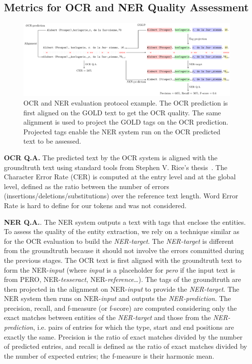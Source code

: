 \subsection{Metrics for OCR and NER Quality Assessment}

\begin{figure}[tb]
    \includegraphics[width=\linewidth]{figs/eval-ocr-ner.pdf}
    \caption{OCR and NER evaluation protocol example. The OCR prediction is first aligned on the GOLD text to get the
    OCR quality. The same alignment is used to project the GOLD tags on the OCR prediction. Projected tags enable
    the NER system run on the OCR predicted text to be assessed.}
    \label{fig.eval-ocr-ner}
\end{figure}

\textbf{OCR Q.A.}  The predicted text by the OCR system is aligned with the groundtruth text using standard tools from
Stephen V. Rice's thesis~\cite{santos.2019.wcmel,neudecker.2021.whdip}. The Character Error Rate (CER) is computed at
the entry level and at the global level, defined as the ratio between the number of errors
(insertions/deletions/substitutions) over the reference text length.
Word Error Rate is hard to define for our tokens and was not considered.



\textbf{NER Q.A.}. The NER system outputs a text with tags that enclose the entities. To assess the quality of the
entity extraction, we rely on a technique similar as for the OCR evaluation to build the \emph{NER-target}. The
\emph{NER-target} is different from the groundtruth because it should not involve the errors committed during the
previous stages. The OCR text is first aligned with the groundtruth text to form the NER-\emph{input} (where
\emph{input} is a placeholder for \emph{pero} if the input text is from PERO, NER-\emph{tesseract},
NER-\emph{reference}\ldots). The tags of the groundtruth are then projected in the alignment on NER-\emph{input} to
provide the \emph{NER-target}. The NER system then runs on NER-\emph{input} and outputs the \emph{NER-prediction}. The
precision, recall, and f-measure (or f-score) are computed considering only the exact matches between entities of the
\emph{NER-target} and those from the \emph{NER-prediction}, i.e. pairs of entries for which the type, start and end
positions are exactly the same. Precision is the ratio of exact matches divided by the number of predicted entries, and
recall is defined as the ratio of exact matches divided by the number of expected entries; the f-measure is their
harmonic mean.

